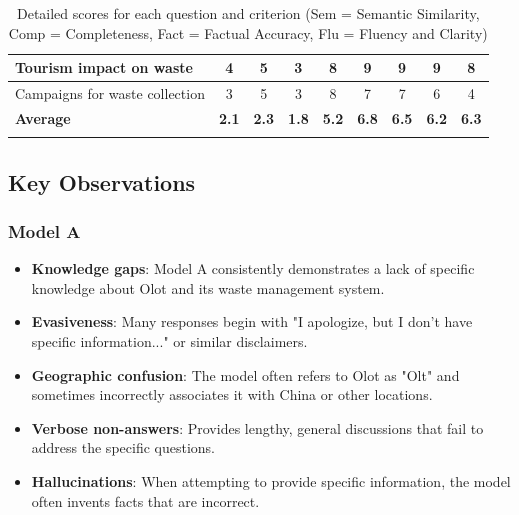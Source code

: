 \begin{longtable}{p{5cm}|cccc|cccc}
    \hline
    Tourism impact on waste              & 4            & 5             & 3             & 8            & 9            & 9             & 9             & 8            \\
    \hline
    Campaigns for waste collection       & 3            & 5             & 3             & 8            & 7            & 7             & 6             & 4            \\
    \hline
    \textbf{Average}                     & \textbf{2.1} & \textbf{2.3}  & \textbf{1.8}  & \textbf{5.2} & \textbf{6.8} & \textbf{6.5} & \textbf{6.2} & \textbf{6.3} \\
    \bottomrule
    \caption{Detailed scores for each question and criterion (Sem = Semantic Similarity, Comp = Completeness, Fact = Factual Accuracy, Flu = Fluency and Clarity)}
\end{longtable}


\subsection{Key Observations}

\subsubsection{Model A}
\begin{itemize}
    \item \textbf{Knowledge gaps}: Model A consistently demonstrates a lack of specific knowledge about Olot and its waste management system.
    \item \textbf{Evasiveness}: Many responses begin with "I apologize, but I don't have specific information..." or similar disclaimers.
    \item \textbf{Geographic confusion}: The model often refers to Olot as "Olt" and sometimes incorrectly associates it with China or other locations.
    \item \textbf{Verbose non-answers}: Provides lengthy, general discussions that fail to address the specific questions.
    \item \textbf{Hallucinations}: When attempting to provide specific information, the model often invents facts that are incorrect.
\end{itemize}

